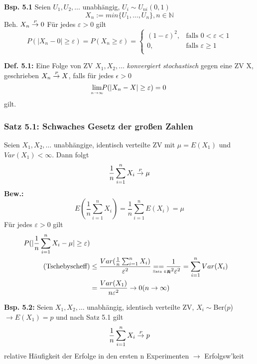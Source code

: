 \documentclass[a4paper,11pt]{article}
\begin{document}
\vspace{6pt}
\noindent\textbf{Bsp. 5.1} 
Seien $U_1,U_2,\dots$ unabhängig, $U_i\sim U_{ni}(0,1)$
\[X_n := min\{U_1,\dots,U_n\}, n\in\mathbb{N}\]
Beh. $X_n\overset{\mathclap{\scriptscriptstyle P}}{\rightarrow} 0$
\newline Für jedes $\varepsilon>0$ gilt 
\begin{equation*}
P(|X_n-0|\geq \varepsilon) = P(X_n\geq\varepsilon)=\begin{cases}
(1-\varepsilon)^2, &\text{falls } 0<\varepsilon<1\\
0, &\text{falls } \varepsilon\geq1\\
\end{cases}
\end{equation*}

\vspace{6pt}
\noindent\textbf{Def. 5.1:} Eine Folge von ZV $X_1,X_2,\dots$ \textit{konvergiert stochastisch} gegen eine ZV X, geschrieben $X_n\overset{\mathclap{\scriptscriptstyle P}}{\rightarrow} X$, falls für jedes $\epsilon>0$
\[\underset{\mathclap{\scriptscriptstyle n\rightarrow\infty}}{\text{lim}} P(|X_n - X| \geq \varepsilon) = 0\]
gilt. 

\subsubsection{Satz 5.1: Schwaches Gesetz der großen Zahlen}
Seien $X_1,X_2,\dots$ unabhängige, identisch verteilte ZV mit $\mu=E(X_1)$ und $Var(X_1)<\infty$. 
\newline Dann folgt
\[\frac{1}{n}\sum_{i=1}^{n}X_i\overset{\mathclap{\scriptscriptstyle P}}{\rightarrow}\mu\]
\textbf{Bew.:}
\[E(\frac{1}{n}\sum_{i=1}^{n}X_i)=\frac{1}{n}\sum_{i=1}^{n}E(X_i)=\mu\]
Für jedes $\varepsilon>0$ gilt 
\begin{align*}
P(|\frac{1}{n}\sum_{i=1}^{n}X_i-\mu|\geq\varepsilon)\\
\text{(Tschebyscheff)} &\leq \frac{Var(\frac{1}{n}\sum_{i=1}^{n}X_i)}{\varepsilon^2} = \underset{\mathclap{\scriptscriptstyle \text{Satz 4.4}}}{=}\frac{1}{n^2\varepsilon^2} = \sum_{i=1}^{n}Var(X_i)\\
&= \frac{Var(X_1)}{n\varepsilon^2} \rightarrow 0 (n\rightarrow\infty)\\
\end{align*}

\vspace{6pt}
\noindent\textbf{Bsp. 5.2:}
Seien $X_1,X_2,\dots$ unabhängig, identisch verteilte ZV, $X_i\sim$Ber($p$)
\newline$\rightarrow E(X_1) = p$ und nach Satz 5.1 gilt
\[\frac{1}{n}\sum_{i=1}^{n}X_i\overset{\mathclap{\scriptscriptstyle P}}{\rightarrow}p\]
relative Häufigkeit der Erfolge in den ersten n Experimenten $\rightarrow$ Erfolgsw'keit
\end{document}

